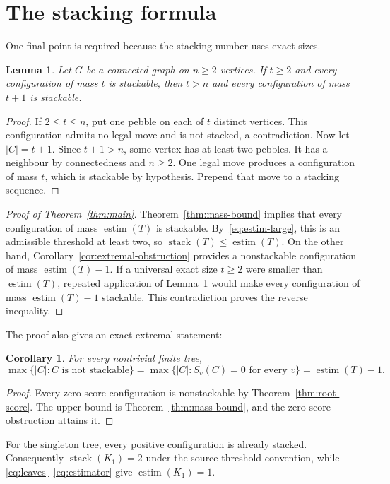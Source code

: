 \documentclass[11pt]{amsart}
\newtheorem{lemma}[theorem]{Lemma}
\newtheorem{corollary}[theorem]{Corollary}
\theoremstyle{definition}
\theoremstyle{remark}
\DeclareMathOperator{\stack}{stack}
\DeclareMathOperator{\estim}{estim}
\newcommand{\mass}[1]{\lvert #1\rvert}
\begin{document}
\section{The stacking formula}\label{sec:formula}
One final point is required because the stacking number uses exact sizes.
\begin{lemma}\label{lem:upward}
Let $G$ be a connected graph on $n\ge2$ vertices. If $t\ge2$ and every
configuration of mass $t$ is stackable, then $t>n$ and every configuration
of mass $t+1$ is stackable.
\end{lemma}
\begin{proof}
If $2\le t\le n$, put one pebble on each of $t$ distinct vertices.
This configuration admits no legal move and is not stacked, a contradiction.
Now let $\mass{C}=t+1$. Since $t+1>n$, some vertex has at least two
pebbles. It has a neighbour by connectedness and $n\ge2$. One legal move
produces a configuration of mass $t$, which is stackable by hypothesis.
Prepend that move to a stacking sequence.
\end{proof}

\begin{proof}[Proof of Theorem~\ref{thm:main}]
Theorem~\ref{thm:mass-bound} implies that every configuration of mass
$\estim(T)$ is stackable. By~\eqref{eq:estim-large}, this is an admissible
threshold at least two, so $\stack(T)\le\estim(T)$.
On the other hand, Corollary~\ref{cor:extremal-obstruction} provides a
nonstackable configuration of mass $\estim(T)-1$. If a universal exact
size $t\ge2$ were smaller than $\estim(T)$, repeated application of
Lemma~\ref{lem:upward} would make every configuration of mass
$\estim(T)-1$ stackable. This contradiction proves the reverse inequality.
\end{proof}

The proof also gives an exact extremal statement:
\begin{corollary}\label{cor:zero-extremal}
For every nontrivial finite tree,
\[
 \max\{\mass{C}:C\text{ is not stackable}\}
 =\max\{\mass{C}:S_v(C)=0\text{ for every }v\}
 =\estim(T)-1.
\]
\end{corollary}
\begin{proof}
Every zero-score configuration is nonstackable by
Theorem~\ref{thm:root-score}. The upper bound is Theorem~\ref{thm:mass-bound},
and the zero-score obstruction attains it.
\end{proof}

For the singleton tree, every positive configuration is already stacked.
Consequently $\stack(K_1)=2$ under the source threshold convention, while
\eqref{eq:leaves}--\eqref{eq:estimator} give $\estim(K_1)=1$.
\end{document}
